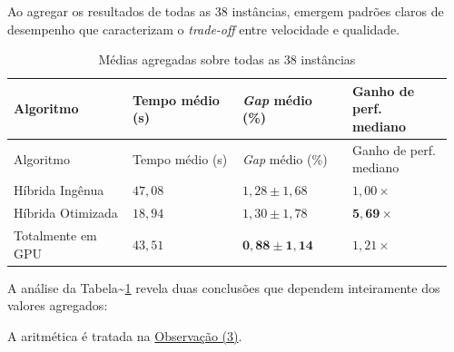 Ao agregar os resultados de todas as 38 instâncias, emergem padrões claros de desempenho que caracterizam o \emph{trade-off} entre velocidade e qualidade.

\begin{longtable}[]{@{}
    >{\raggedright\arraybackslash}p{0.26\linewidth}
    >{\centering\arraybackslash}p{0.24\linewidth}
    >{\centering\arraybackslash}p{0.24\linewidth}
    >{\centering\arraybackslash}p{0.22\linewidth}@{}}
  \caption{Médias agregadas sobre todas as 38 instâncias
    \label{tbl:results-aggregated}}                                           \\
  \toprule
  Algoritmo         & Tempo médio (s) & \emph{Gap} médio (\%)         & Ganho de perf. mediano    \\
  \midrule
  \endfirsthead
  \toprule
  Algoritmo         & Tempo médio (s) & \emph{Gap} médio (\%)         & Ganho de perf. mediano    \\
  \midrule
  \endhead
  \bottomrule
  \endlastfoot
  Híbrida Ingênua   & \(47{,}08\)     & \(1{,}28 \pm 1{,}68\)         & \(1{,}00\times\)          \\
  Híbrida Otimizada & \(18{,}94\)     & \(1{,}30 \pm 1{,}78\)         & \(\mathbf{5{,}69\times}\) \\
  Totalmente em GPU & \(43{,}51\)     & \(\mathbf{0{,}88 \pm 1{,}14}\) & \(1{,}21\times\)          \\
\end{longtable}


A análise da Tabela\textasciitilde{}\ref{tbl:results-aggregated} revela duas conclusões que dependem inteiramente dos valores agregados:

\begin{warning}\label{obs-conclusoes-agregadas}
  A aritmética é tratada na \hyperref[obs-aritmetica]{Observação (3)}.
\end{warning}

